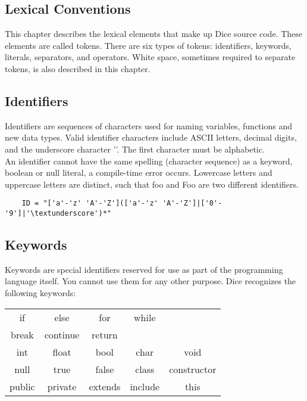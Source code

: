 \begin{homeworkProblem}
	\chapter{Lexical Conventions}
	This chapter describes the lexical elements that make up Dice source code. These elements are called tokens. There are six types of tokens: identifiers, keywords, literals, separators, and operators. White space, sometimes required to separate tokens, is also described in this chapter.
	
	\section{Identifiers}
	Identifiers are sequences of characters used for naming variables, functions and new data types. Valid identifier characters include ASCII letters, decimal digits, and the underscore character '\textunderscore'. The first character must be alphabetic.\\
	An identifier cannot have the same spelling (character sequence) as a keyword, boolean or null literal, a compile-time error occurs. Lowercase letters and uppercase letters are distinct, such that foo and Foo are two different identifiers.
	
	\begin{verbatim}
	ID = "['a'-'z' 'A'-'Z'](['a'-'z' 'A'-'Z']|['0'-'9']|'\textunderscore')*"
	\end{verbatim}
	
	\section{Keywords}
	Keywords are special identifiers reserved for use as part of the programming language itself. You cannot use them for any other purpose. Dice recognizes the following keywords:
	
	\begin{center}
		\begin{tabular}{ccccc}
		if & else & for & while \\ 
        break & continue & return \\
		int & float & bool & char & void \\
		null & true & false & class & constructor \\
		public & private & extends & include & this \\
		\end{tabular}
	\end{center}


\end{homeworkProblem}
